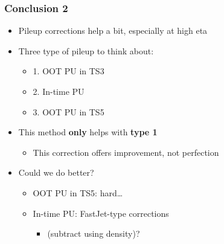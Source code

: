\documentclass[bigger]{beamer}
\providecommand{\alert}[1]{\textbf{#1}}
\begin{document}
\begin{frame}
\frametitle{Conclusion 2}
\label{sec-4-1-2}
\begin{itemize}

\item Pileup corrections help a bit, especially at high eta
\label{sec-4-1-2-1}%

\item Three type of pileup to think about:
\label{sec-4-1-2-2}%
\begin{itemize}

\item 1. OOT PU in TS3
\label{sec-4-1-2-2-1}%

\item 2. In-time PU
\label{sec-4-1-2-2-2}%

\item 3. OOT PU in TS5
\label{sec-4-1-2-2-3}%
\end{itemize} %

\item This method \alert{only} helps with \alert{type 1}
\label{sec-4-1-2-3}%
\begin{itemize}

\item This correction offers improvement, not perfection
\label{sec-4-1-2-3-1}%
\end{itemize} %

\item Could we do better?
\label{sec-4-1-2-4}%
\begin{itemize}

\item OOT PU in TS5: hard\ldots{}
\label{sec-4-1-2-4-1}%

\item In-time PU: FastJet-type corrections
\label{sec-4-1-2-4-2}%
\begin{itemize}

\item (subtract using density)?
\label{sec-4-1-2-4-2-1}%
\end{itemize} %
\end{itemize} %
\end{itemize} %
\end{frame}
\end{document}
